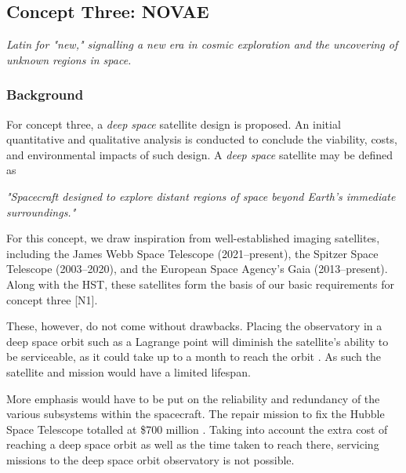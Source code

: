 \subsection{Concept Three: NOVAE}
\begin{center}
    \textit{Latin for "new," signalling a new era in cosmic exploration and the uncovering of unknown regions in space.}
\end{center}
\subsubsection{Background}
For concept three, a \textit{deep space} satellite design is proposed. An initial quantitative and qualitative analysis is conducted to conclude the viability, costs, and environmental impacts of such design. A \textit{deep space} satellite may be defined as \cite{DeepSpaceSatelliteDef}

\begin{center}
    \textit{"Spacecraft designed to explore distant regions of space beyond Earth's immediate surroundings."}
\end{center}For this concept, we draw inspiration from well-established imaging satellites, including the James Webb Space Telescope (2021–present), the Spitzer Space Telescope (2003–2020), and the European Space Agency's Gaia (2013–present). Along with the HST, these satellites form the basis of our basic requirements for concept three [N1].
\vspace{2mm}


These, however, do not come without drawbacks. Placing the observatory in a deep space orbit such as a Lagrange point will diminish the satellite's ability to be serviceable, as it could take up to a month to reach the orbit \cite{JWorbit}. As such the satellite and mission would have a limited lifespan.
\vspace{2mm}

More emphasis would have to be put on the reliability and redundancy of the various subsystems within the spacecraft. The repair mission to fix the Hubble Space Telescope totalled at \$700 million \cite{NASA_Hubble_Mission}. Taking into account the extra cost of reaching a deep space orbit as well as the time taken to reach there, servicing missions to the deep space orbit observatory is not possible. 
